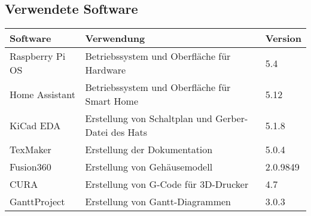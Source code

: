 \subsection{Verwendete Software}
\begin{tabular}{|l|l|l|}
 	\hline 
 	\textbf{Software} & \textbf{Verwendung} & \textbf{Version} \\ 
 	\hline 
 	Raspberry Pi OS & Betriebssystem und Oberfläche für Hardware & 5.4 \\ 
 	\hline 
 	Home Assistant & Betriebssystem und Oberfläche für Smart Home & 5.12 \\ 
 	\hline 
 	KiCad EDA & Erstellung von Schaltplan und Gerber-Datei des Hats & 5.1.8 \\ 
 	\hline 
 	TexMaker & Erstellung der Dokumentation & 5.0.4 \\ 
 	\hline 
 	Fusion360 & Erstellung von Gehäusemodell & 2.0.9849 \\ 
 	\hline
 	CURA & Erstellung von G-Code für 3D-Drucker & 4.7 \\ 
 	\hline
 	GanttProject & Erstellung von Gantt-Diagrammen & 3.0.3 \\ 
 	\hline
\end{tabular} 